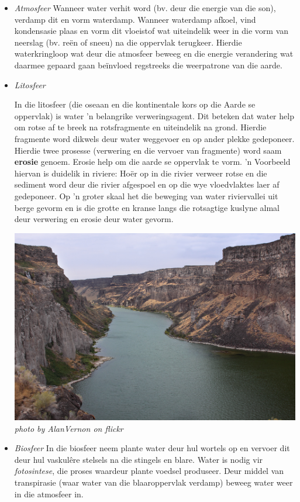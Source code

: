       \label{m38138*id334463}\begin{itemize}[noitemsep]
            \label{m38138*uid1}\item \textsl{Atmosfeer}
Wanneer water verhit word (bv. deur die energie van die son), verdamp dit en vorm waterdamp. Wanneer waterdamp afkoel, vind kondensasie plaas en vorm dit vloeistof wat uiteindelik weer in die vorm van neerslag (bv. re\"{e}n of sneeu) na die oppervlak terugkeer. Hierdie waterkringloop wat deur die atmosfeer beweeg en die energie verandering wat daarmee gepaard gaan beïnvloed regstreeks die weerpatrone van die aarde.
\label{m38138*uid2}\item \textsl{Litosfeer} \\
\begin{minipage}{.6\textwidth}
In die litosfeer (die oseaan en die kontinentale kors op die Aarde se oppervlak) is water  'n belangrike verweringsagent. Dit beteken dat water help om rotse af te breek na rotsfragmente en uiteindelik na grond. Hierdie fragmente word dikwels deur water weggevoer en op ander plekke gedeponeer. Hierdie twee prosesse (verwering en die vervoer van fragmente) word saam \textbf{erosie} genoem. Erosie help om die aarde se oppervlak te vorm.  'n Voorbeeld hiervan is duidelik in riviere: Ho\"{e}r op in die rivier verweer rotse en die sediment word deur die rivier afgespoel en op die wye vloedvlaktes laer af gedeponeer. Op  'n groter skaal het die beweging van water riviervallei uit berge gevorm en is die grotte en kranse langs die rotsagtige kuslyne almal deur verwering en erosie deur water gevorm.
\end{minipage}
\begin{minipage}{.4\textwidth}
 \begin{center}
  \includegraphics[width=.6\textwidth]{photos/AlanVernon.jpg}\\
\textsl{photo by AlanVernon on flickr}
 \end{center}
\end{minipage}
\label{m38138*uid3}\item \textsl{Biosfeer}
In die biosfeer neem plante water deur hul wortels op en vervoer dit deur hul vaskul\^{e}re stelsels na die stingels en blare. Water is nodig vir \textsl{fotosintese}, die proses waardeur plante voedsel produseer. Deur middel van transpirasie (waar water van die blaaroppervlak verdamp) beweeg water weer in die atmosfeer in.
\end{itemize}


